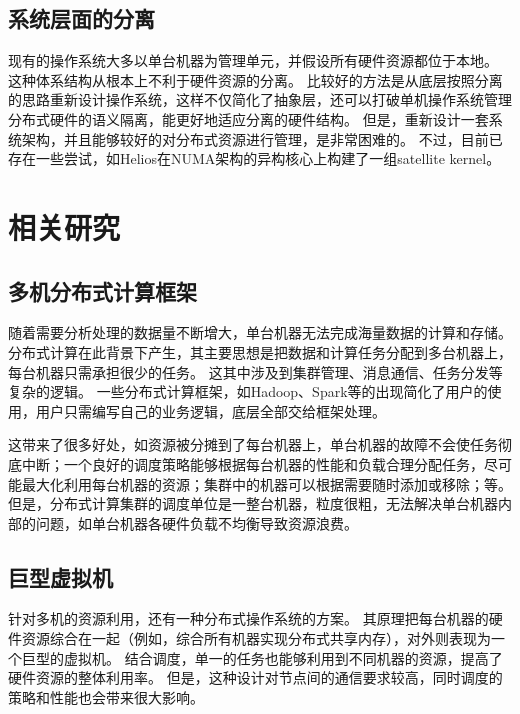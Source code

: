\subsection{系统层面的分离}

现有的操作系统大多以单台机器为管理单元，并假设所有硬件资源都位于本地。
这种体系结构从根本上不利于硬件资源的分离。
比较好的方法是从底层按照分离的思路重新设计操作系统，这样不仅简化了抽象层，还可以打破单机操作系统管理分布式硬件的语义隔离，能更好地适应分离的硬件结构。
但是，重新设计一套系统架构，并且能够较好的对分布式资源进行管理，是非常困难的。
不过，目前已存在一些尝试，如Helios\parencite{nightingale2009helios}在NUMA架构的异构核心上构建了一组satellite kernel。


\section{相关研究}

\subsection{多机分布式计算框架}

随着需要分析处理的数据量不断增大，单台机器无法完成海量数据的计算和存储。
分布式计算在此背景下产生，其主要思想是把数据和计算任务分配到多台机器上，每台机器只需承担很少的任务。
这其中涉及到集群管理、消息通信、任务分发等复杂的逻辑。
一些分布式计算框架，如Hadoop、Spark等的出现简化了用户的使用，用户只需编写自己的业务逻辑，底层全部交给框架处理。

这带来了很多好处，如资源被分摊到了每台机器上，单台机器的故障不会使任务彻底中断；一个良好的调度策略能够根据每台机器的性能和负载合理分配任务，尽可能最大化利用每台机器的资源；集群中的机器可以根据需要随时添加或移除；等。
但是，分布式计算集群的调度单位是一整台机器，粒度很粗，无法解决单台机器内部的问题，如单台机器各硬件负载不均衡导致资源浪费。

\subsection{巨型虚拟机}

针对多机的资源利用，还有一种分布式操作系统的方案。
其原理把每台机器的硬件资源综合在一起（例如，综合所有机器实现分布式共享内存），对外则表现为一个巨型的虚拟机。
结合调度，单一的任务也能够利用到不同机器的资源，提高了硬件资源的整体利用率。
但是，这种设计对节点间的通信要求较高，同时调度的策略和性能也会带来很大影响。

